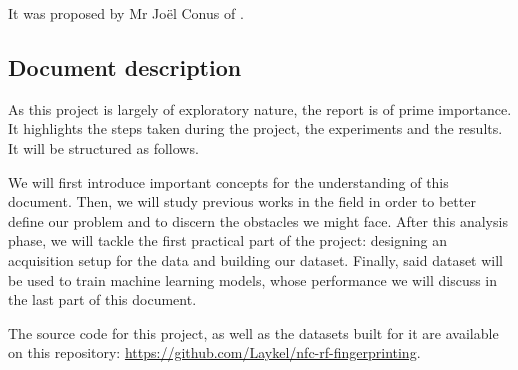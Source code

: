 It was proposed by Mr Joël Conus of \TBindustryName.

\subsection{Document description}

As this project is largely of exploratory nature, the report is of prime importance. It highlights the steps taken during the project, the experiments and the results. It will be structured as follows.

We will first introduce important concepts for the understanding of this document. Then, we will study previous works in the field in order to better define our problem and to discern the obstacles we might face. After this analysis phase, we will tackle the first practical part of the project: designing an acquisition setup for the data and building our dataset. Finally, said dataset will be used to train machine learning models, whose performance we will discuss in the last part of this document.

The source code for this project, as well as the datasets built for it are available on this repository: \url{https://github.com/Laykel/nfc-rf-fingerprinting}.
